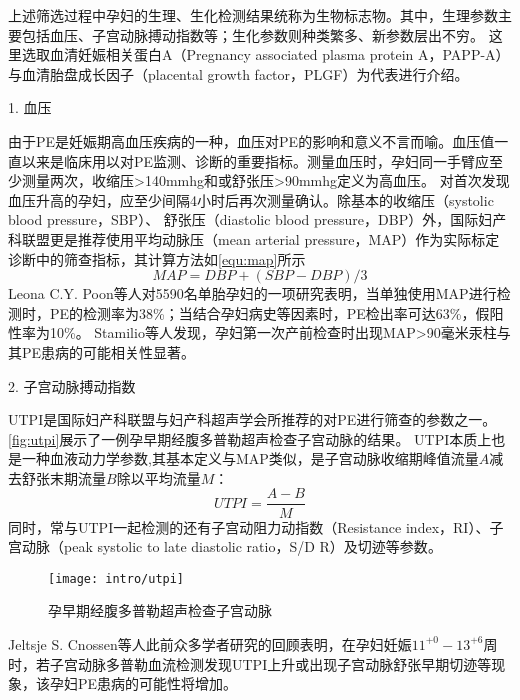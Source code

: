 上述筛选过程中孕妇的生理、生化检测结果统称为生物标志物。其中，生理参数主要包括血压、子宫动脉搏动指数等；生化参数则种类繁多、新参数层出不穷\cite{Rene2008,Zhong2015,Zeisler2016,Rana2012}。
这里选取血清妊娠相关蛋白A（Pregnancy associated plasma protein A，PAPP-A）与血清胎盘成长因子（placental growth factor，PLGF）为代表进行介绍。

1. 血压

由于PE是妊娠期高血压疾病的一种，血压对PE的影响和意义不言而喻\cite{OAG9,HDASOM,2000s1}。血压值一直以来是临床用以对PE监测、诊断的重要指标。测量血压时，孕妇同一手臂应至少测量两次，收缩压>140mmhg和或舒张压>90mmhg定义为高血压。
对首次发现血压升高的孕妇，应至少间隔4小时后再次测量确认\cite{OAG9}。除基本的收缩压（systolic blood pressure，SBP）、
舒张压（diastolic blood pressure，DBP）外，国际妇产科联盟更是推荐使用平均动脉压（mean arterial pressure，MAP）作为实际标定诊断中的筛查指标，其计算方法如\autoref{equ:map}所示\cite{FIGO}
\begin{equation}
    \label{equ:map}
    MAP=DBP+(SBP-DBP)/3
\end{equation}
Leona C.Y. Poon等人对5590名单胎孕妇的一项研究表明，当单独使用MAP进行检测时，PE的检测率为38\%；当结合孕妇病史等因素时，PE检出率可达63\%，假阳性率为10\%\cite{Poon2008}。
Stamilio等人发现，孕妇第一次产前检查时出现MAP>90毫米汞柱与其PE患病的可能相关性显著\cite{Stamilio2000}。

2. 子宫动脉搏动指数

UTPI是国际妇产科联盟与妇产科超声学会所推荐的对PE进行筛查的参数之一\cite{FIGO,Sotiriadis2019}。\autoref{fig:utpi}展示了一例孕早期经腹多普勒超声检查子宫动脉的结果\cite{Sotiriadis2019}。
UTPI本质上也是一种血液动力学参数,其基本定义与MAP类似，是子宫动脉收缩期峰值流量$A$减去舒张末期流量$B$除以平均流量$M$\cite{Cnossen2008}：
\begin{equation}
    \label{equ:utpi}
    UTPI=\frac{A-B}{M}
\end{equation}
同时，常与UTPI一起检测的还有子宫动阻力动指数（Resistance index，RI）、子宫动脉（peak systolic to late diastolic ratio，S/D R）及切迹等参数\cite{Cnossen2008}。
\begin{figure}[htbp]
    \centering
    \texttt{[image: intro/utpi]}
    \caption{\label{fig:utpi}孕早期经腹多普勒超声检查子宫动脉}
\end{figure}
Jeltsje S. Cnossen等人\cite{Cnossen2008}此前众多学者研究的回顾表明，在孕妇妊娠$11^{+0}-13^{+6}$周时，若子宫动脉多普勒血流检测发现UTPI上升或出现子宫动脉舒张早期切迹等现象，该孕妇PE患病的可能性将增加\cite{OAG9,Plasencia2008}。

